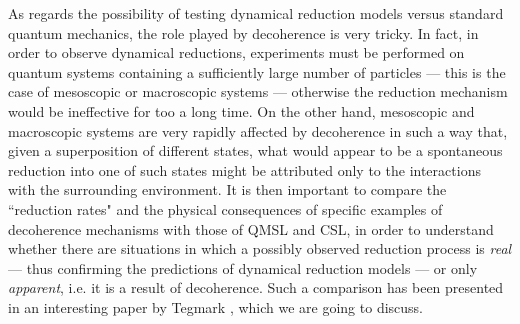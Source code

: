 \documentclass[12pt]{article}
\begin{document}
As regards the possibility of testing dynamical reduction models
versus standard quantum mechanics, the role played by decoherence
is very tricky. In fact, in order to observe dynamical reductions,
experiments must be performed on quantum systems containing a
sufficiently large number of particles --- this is the case of
mesoscopic or macroscopic systems --- otherwise the reduction
mechanism would be ineffective for too a long time. On the other
hand, mesoscopic and macroscopic systems are very rapidly affected
by decoherence in such a way that, given a superposition of
different states, what would appear to be a spontaneous reduction
into one of such states might be attributed only to the
interactions with the surrounding environment. It is then
important to compare the ``reduction rates" and the physical
consequences of specific examples of decoherence mechanisms  with
those of QMSL and CSL, in order to understand whether there are
situations in which a possibly observed reduction process is
{\it real} --- thus confirming the predictions of dynamical
reduction models --- or only {\it apparent}, i.e. it is a result of
decoherence. Such a comparison has been presented in an
interesting  paper by Tegmark \cite{teg}, which we are going to
discuss.
\end{document}
